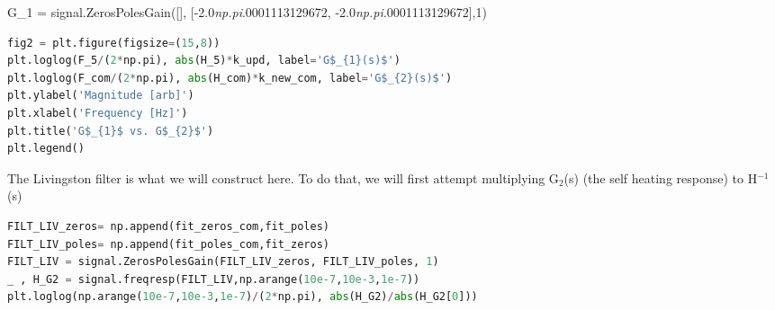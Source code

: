 \noindent G\_1 = signal.ZerosPolesGain({[}{]}, {[}-2.0\emph{np.pi}.0001113129672, -2.0\emph{np.pi}.0001113129672{]},1) 




\begin{spacing}{1.2} \begin{lstlisting}[frame=single,language=Python]
fig2 = plt.figure(figsize=(15,8))
plt.loglog(F_5/(2*np.pi), abs(H_5)*k_upd, label='G$_{1}(s)$')
plt.loglog(F_com/(2*np.pi), abs(H_com)*k_new_com, label='G$_{2}(s)$')
plt.ylabel('Magnitude [arb]')
plt.xlabel('Frequency [Hz]')
plt.title('G$_{1}$ vs. G$_{2}$')
plt.legend()
\end{lstlisting} \end{spacing}



\noindent The Livingston filter is what we will construct here. To do that, we will first attempt multiplying G\(_{2}\)(s) (the self heating response) to H\(^{-1}\)(s)

\begin{spacing}{1.2} \begin{lstlisting}[frame=single,language=Python]
FILT_LIV_zeros= np.append(fit_zeros_com,fit_poles)
FILT_LIV_poles= np.append(fit_poles_com,fit_zeros)
FILT_LIV = signal.ZerosPolesGain(FILT_LIV_zeros, FILT_LIV_poles, 1)
_ , H_G2 = signal.freqresp(FILT_LIV,np.arange(10e-7,10e-3,1e-7))
plt.loglog(np.arange(10e-7,10e-3,1e-7)/(2*np.pi), abs(H_G2)/abs(H_G2[0]))
\end{lstlisting} \end{spacing}

